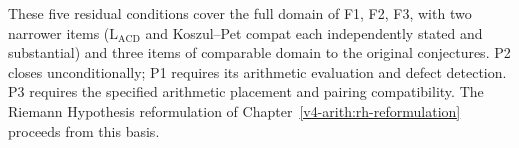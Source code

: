These five residual conditions cover the full domain of F1, F2, F3,
with two narrower items (\(\mathrm{L}_{\mathrm{ACD}}\) and Koszul--Pet compat
each independently stated and substantial) and three items of
comparable domain to the original conjectures. P2 closes unconditionally;
P1 requires its arithmetic evaluation and defect detection.
P3 requires the specified arithmetic placement and pairing compatibility. The Riemann Hypothesis reformulation of
Chapter~\ref{v4-arith:rh-reformulation} proceeds from this basis.
